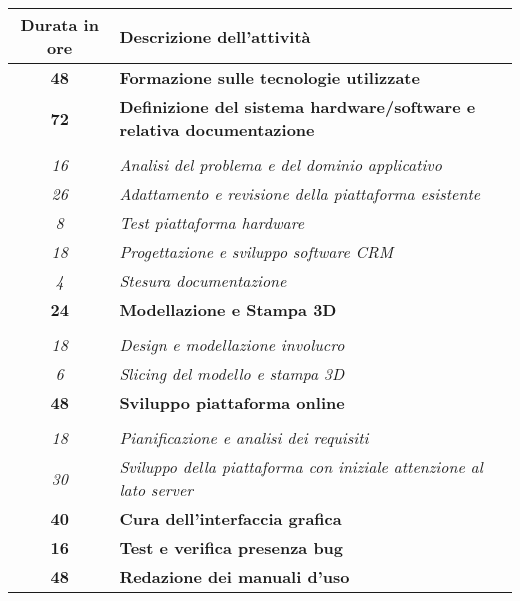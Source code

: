 

\begin{tabularx}{\textwidth}{|c|X|}
	\hline
	\textbf{Durata in ore} & \textbf{Descrizione dell'attività} \\\hline
	
	\textbf{48} & \textbf{Formazione sulle tecnologie utilizzate} \\	 
    \hline
    
    \textbf{72} & \textbf{Definizione del sistema hardware/software e relativa documentazione} \\ \hdashline 
    \multirow{3}{0cm}\\ 
    \textit{16} & 
    \textit{Analisi del problema e del dominio applicativo} \\
    \textit{26} & 
    \textit{Adattamento e revisione della piattaforma esistente} \\
    \textit{8} & 
    \textit{Test piattaforma hardware} \\
    \textit{18} & 
    \textit{Progettazione e sviluppo software CRM} \\
    \textit{4} & 
    \textit{Stesura documentazione} \\
    \hline
    
    \textbf{24} & \textbf{Modellazione e Stampa 3D}  \\ \hdashline 
    \multirow{4}{0cm}\\ 
    \textit{18} & 
    \textit{Design e modellazione involucro} \\
    \textit{6} & 
    \textit{Slicing del modello e stampa 3D} \\
    \hline
    
    \textbf{48} & \textbf{Sviluppo piattaforma online}  \\ \hdashline 
    \multirow{4}{0cm}\\ 
    \textit{18} & 
    \textit{Pianificazione e analisi dei requisiti} \\
    \textit{30} & 
    \textit{Sviluppo della piattaforma con iniziale attenzione al lato server} \\
    \hline
    
    \textbf{40} & \textbf{Cura dell'interfaccia grafica}  \\ 
    \hline
    
    \textbf{16} & \textbf{Test e verifica presenza bug}  \\
    \hline
    
	\textbf{48} & \textbf{Redazione dei manuali d'uso}  \\
    \hline    
    

\end{tabularx}
